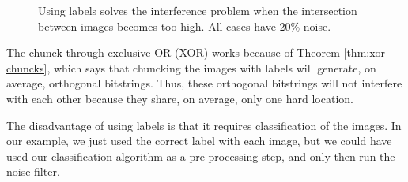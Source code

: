 \begin{figure}[!tb]
  \captionsetup[subfigure]{labelformat=empty}




  \caption{Using labels solves the interference problem when the intersection between images becomes too high. All cases have 20\% noise.
  \label{fig:filter-results2-chunk}
  }
\end{figure}

The chunck through exclusive OR (XOR) works because of Theorem \ref{thm:xor-chuncks}, which says that chuncking the images with labels will generate, on average, orthogonal bitstrings. Thus, these orthogonal bitstrings will not interfere with each other because they share, on average, only one hard location.

The disadvantage of using labels is that it requires classification of the images. In our example, we just used the correct label with each image, but we could have used our classification algorithm as a pre-processing step, and only then run the noise filter.

